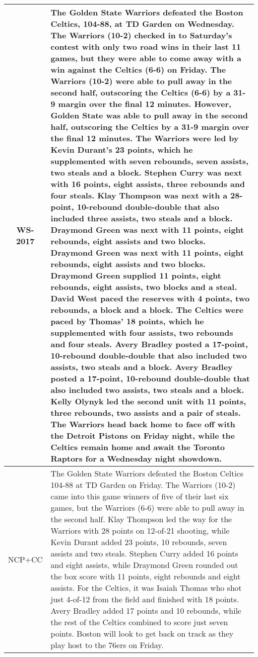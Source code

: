 \documentclass[letterpaper]{article} \usepackage{aaai19}  \usepackage{times}  \usepackage{helvet}  \usepackage{courier}  \usepackage{url}  \usepackage{graphicx}  \frenchspacing  \setlength{\pdfpagewidth}{8.5in}  \setlength{\pdfpageheight}{11in}  \graphicspath{ {images/} }
\begin{document}
\begin{table*}
\begin{tabular}{|c|p{15.5cm}|}
WS-2017 & {\color{blue}The Golden State Warriors defeated the Boston Celtics, 104-88}, at TD Garden on Wednesday. The {\color{blue}Warriors (10-2)} checked in to Saturday's contest with only two road wins in their last 11 games, but they were able to come away with a win against the {\color{blue}Celtics (6-6)} on Friday. The {\color{blue}Warriors (10-2)} were able to pull away in the second half, {\color{red}outscoring the Celtics (6-6) by a 31-9 margin }over the final 12 minutes. However, Golden State was able to pull away in the second half, {\color{red}outscoring the Celtics by a 31-9 margin} over the final 12 minutes. The {\color{red}Warriors were led by Kevin Durant}'s {\color{blue}23 points}, which he supplemented with {\color{red}seven} rebounds, {\color{blue}seven assists, two steals and a block}. Stephen Curry was next {\color{blue}with 16 points, eight assists, three rebounds and four steals}. {\color{blue}Klay Thompson was next with a 28-point}, {\color{red}10-rebound} double-double that also included {\color{blue}three assists}, {\color{red}two steals and a block}. {\color{blue}Draymond Green was next with 11 points, eight rebounds, eight assists and two blocks. {\color{orange}Draymond Green was next with 11 points, eight rebounds, eight assists and two blocks. Draymond Green supplied 11 points, eight rebounds, eight assists, two blocks and a steal}}. {\color{blue}David West paced the reserves with 4 points, two rebounds, a block and a block}. The Celtics were paced by {\color{blue}Thomas' 18 points, which he supplemented with four assists, two rebounds} and {\color{red}four steals}. {\color{blue}Avery Bradley posted a 17-point, 10-rebound double-double that also included two assists, two steals and a block. {\color{orange}Avery Bradley posted a 17-point, 10-rebound double-double that also included two assists, two steals and a block}}. {\color{red}Kelly Olynyk led the second unit with 11 points}, {\color{blue}three rebounds, two assists} and {\color{red}a pair of steals}. The Warriors head back home to face off with the Detroit Pistons on Friday night, while the Celtics remain home and await the Toronto Raptors for a Wednesday night showdown. \\ 
\hline 
NCP+CC & {\color{blue}The Golden State Warriors defeated the Boston Celtics 104-88 }at TD Garden on Friday. {\color{blue}The Warriors (10-2)} came into this game winners of five of their last six games, but the {\color{red}Warriors (6-6)} were able to pull away in the second half. {\color{blue}Klay Thompson led the way for the Warriors with 28 points on 12-of-21 shooting, while Kevin Durant added 23 points, 10 rebounds, seven assists and two steals. Stephen Curry added 16 points and eight assists, while Draymond Green rounded out the box score with 11 points, eight rebounds and eight assists. For the Celtics, it was Isaiah Thomas who shot just 4-of-12 from the field and finished with 18 points. Avery Bradley added 17 points and 10 rebounds}, while the rest of the Celtics {\color{red}combined to score just seven points}. Boston will look to get back on track as they play host to the 76ers on Friday. \\ 

\end{tabular}
\end{table*}
\end{document}
